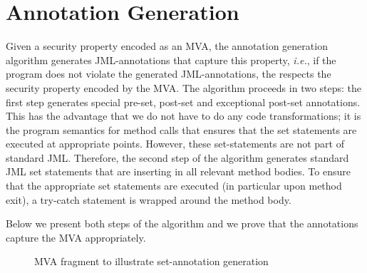 \section{Annotation Generation}\label{SecAnnotGen} 

Given a security property encoded as an MVA, the annotation generation
algorithm generates JML-annotations that capture this property,
\emph{i.e.}, if the program does not violate the generated
JML-annotations, the respects the security property encoded by the
MVA. The algorithm proceeds in two steps: the first step generates
special pre-set, post-set and exceptional post-set annotations. This
has the advantage that we do not have to do any code transformations;
it is the program semantics for method calls that ensures that the set
statements are executed at appropriate points. However, these
set-statements are not part of standard JML. Therefore, the second
step of the algorithm generates standard JML set statements that are
inserting in all relevant method bodies. To ensure that the
appropriate set statements are executed (in particular upon method
exit), a try-catch statement is wrapped around the method body. 

Below we present both steps of the algorithm and we prove that the
annotations capture the MVA appropriately.

\begin{figure}
\begin{center}
\end{center}
\caption{MVA fragment to illustrate set-annotation
generation}\label{FigAnnotGenExample}

\end{figure}
